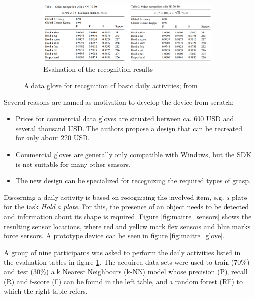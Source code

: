 \documentclass[hyperref, bachelorofscience]{cgvpub}
\begin{document}
\begin{figure}
	\vspace{.5cm}
	\begin{subfigure}{\linewidth}
		\includegraphics[width=\linewidth]{../pics/maitre_results}
		\caption{Evaluation of the recognition results}
		\label{fig:maitre_results}
	\end{subfigure}
	\caption[A data glove for recognition of basic daily activities]{A data glove for recognition of basic daily activities; from \cite{maitre19}}
	\label{fig:maitre}
\end{figure}

Several reasons are named as motivation to develop the device from scratch:
\begin{itemize}
	\item Prices for commercial data gloves are situated between ca. 600 USD and several thousand USD. The authors propose a design that can be recreated for only about 220 USD.
	\item Commercial gloves are generally only compatible with Windows, but the SDK is not suitable for many other sensors.
	\item The new design can be specialized for recognizing the required types of grasp.
\end{itemize}

Discerning a daily activity is based on recognizing the involved item, e.g. a plate for the task \emph{Hold a plate}. For this, the presence of an object needs to be detected and information about its shape is required. Figure \ref{fig:maitre_sensors} shows the resulting sensor locations, where red and yellow mark flex sensors and blue marks force sensors. A prototype device can be seen in figure \ref{fig:maitre_glove}. 

A group of nine participants was asked to perform the daily activities listed in the evaluation tables in figure \ref{fig:maitre_results}. The acquired data sets were used to train (70\%) and test (30\%) a k Nearest Neighbours (k-NN) model whose precision (P), recall (R) and f-score (F) can be found in the left table, and a random forest (RF) to which the right table refers.
\end{document}
